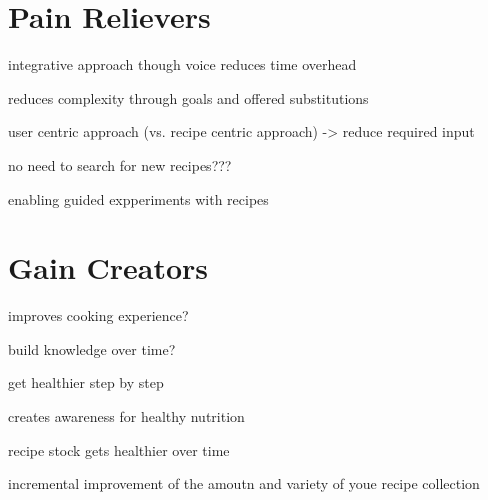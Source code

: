 \section{Pain Relievers}

integrative approach though voice reduces time overhead

reduces complexity through goals and offered substitutions

user centric approach (vs. recipe centric approach) -> reduce required input

no need to search for new recipes???

enabling guided expperiments with recipes

\section{Gain Creators}

improves cooking experience?

build knowledge over time?

get healthier step by step

creates awareness for healthy nutrition

recipe stock gets healthier over time

incremental improvement of the amoutn and variety of youe recipe collection



